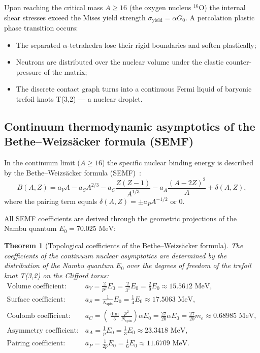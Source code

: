 \documentclass[11pt,a4paper]{article}
\newtheorem{theorem}{Theorem}
\theoremstyle{definition}
\theoremstyle{remark}
\begin{document}
Upon reaching the critical mass $A \ge 16$ (the oxygen nucleus $^{16}\mathrm{O}$) the internal shear stresses exceed the Mises yield strength $\sigma_{\mathrm{yield}} = \alpha G_0$. A percolation plastic phase transition occurs:
\begin{itemize}
	\item The separated $\alpha$-tetrahedra lose their rigid boundaries and soften plastically;
	\item Neutrons are distributed over the nuclear volume under the elastic counter-pressure of the matrix;
	\item The discrete contact graph turns into a continuous Fermi liquid of baryonic trefoil knots T(3,2) — a nuclear droplet.
\end{itemize}

\subsection{Continuum thermodynamic asymptotics of the Bethe--Weizsäcker formula (SEMF)}

In the continuum limit ($A \ge 16$) the specific nuclear binding energy is described by the Bethe--Weizsäcker formula (SEMF)~\cite{Weizsacker1935,BetheBacher1936}:
\begin{equation}
	B(A, Z) = a_V A - a_S A^{2/3} - a_C \frac{Z(Z-1)}{A^{1/3}} - a_A \frac{(A - 2Z)^2}{A} + \delta(A, Z),
\label{eq:semf_formula}
\end{equation}
where the pairing term equals $\delta(A, Z) = \pm a_P A^{-1/2}$ or $0$.

All SEMF coefficients are derived through the geometric projections of the Nambu quantum $E_0 = 70.025\text{ MeV}$:

\begin{theorem}[Topological coefficients of the Bethe--Weizsäcker formula]
\label{thm:semf_coefficients_derivation}
The coefficients of the continuum nuclear asymptotics are determined by the distribution of the Nambu quantum $E_0$ over the degrees of freedom of the trefoil knot T(3,2) on the Clifford torus:
\begin{align}
	\text{Volume coefficient:} \quad & a_V = \frac{2}{p^2} E_0 = \frac{2}{3^2} E_0 = \frac{2}{9} E_0 \approx 15.5612\text{ MeV}, \label{eq:semf_aV} \\
	\text{Surface coefficient:} \quad & a_S = \frac{1}{N_{\mathrm{spin}}} E_0 = \frac{1}{4} E_0 \approx 17.5063\text{ MeV}, \label{eq:semf_aS} \\
	\text{Coulomb coefficient:} \quad & a_C = \left(\frac{\dim}{5} \frac{p^2}{N_{\mathrm{spin}}}\right) \alpha E_0 = \frac{27}{20} \alpha E_0 = \frac{27}{20} m_e \approx 0.68985\text{ MeV}, \label{eq:semf_aC} \\
	\text{Asymmetry coefficient:} \quad & a_A = \frac{1}{p} E_0 = \frac{1}{3} E_0 \approx 23.3418\text{ MeV}, \label{eq:semf_aA} \\
	\text{Pairing coefficient:} \quad & a_P = \frac{1}{2p} E_0 = \frac{1}{6} E_0 \approx 11.6709\text{ MeV}. \label{eq:semf_aP}
\end{align}
\end{theorem}
\end{document}
